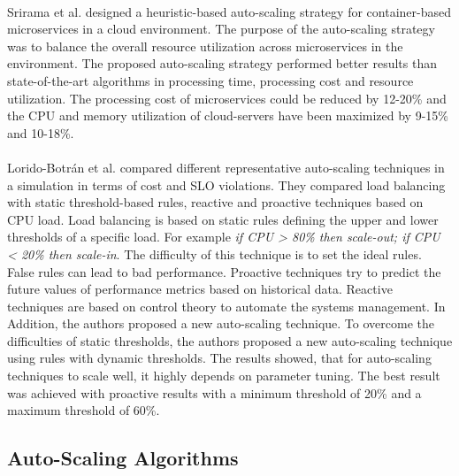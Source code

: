 \paragraph{}Srirama et al. \citep{Srirama2020AppDeplyCont} designed a heuristic-based auto-scaling strategy for container-based microservices in a cloud environment. The purpose of the auto-scaling strategy was to balance the overall resource utilization across microservices in the environment.
The proposed auto-scaling strategy performed better results than state-of-the-art algorithms in processing time, processing cost and resource utilization. The processing cost of microservices could be reduced by 12-20\% and the CPU and memory utilization of cloud-servers have been maximized by 9-15\% and 10-18\%.


\paragraph{}Lorido-Botrán et al.  \cite{Botran2013AutoScalingComp} compared different representative auto-scaling techniques in a simulation in terms of cost and SLO violations. They compared load balancing with static threshold-based rules, reactive and proactive techniques based on CPU load.
Load balancing is based on static rules defining the upper and lower thresholds of a specific load. For example \textit{if CPU > 80\% then scale-out; if CPU < 20\% then scale-in}. The difficulty of this technique is to set the ideal rules. False rules can lead to bad performance. Proactive techniques try to predict the future values of performance metrics based on historical data. Reactive techniques are based on control theory to automate the systems management. In Addition, the authors proposed a new auto-scaling technique. To overcome the difficulties of static thresholds, the authors proposed a new auto-scaling technique using rules with dynamic thresholds. The results showed, that for auto-scaling techniques to scale well, it highly depends on parameter tuning. The best result was achieved with proactive results with a minimum threshold of 20\% and a maximum threshold of 60\%.


\subsection{Auto-Scaling Algorithms}
